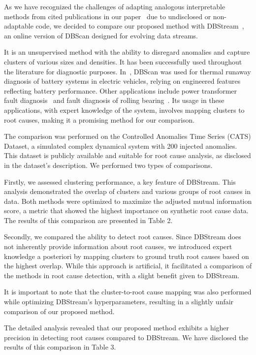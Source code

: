 \documentclass{article}
\begin{document}
\begin{enumerate}
        As we have recognized the challenges of adapting analogous interpretable methods from cited publications in our paper~\cite{Yang2022, Steenwinckel2021} due to undisclosed or non-adaptable code, we decided to compare our proposed method with DBStream~\cite{Hahsler2016}, an online version of DBScan designed for evolving data streams. 
        
        It is an unsupervised method with the ability to disregard anomalies and capture clusters of various sizes and densities. It has been successfully used throughout the literature for diagnostic purposes. In~\cite{Li2019}, DBScan was used for thermal runaway diagnosis of battery systems in electric vehicles, relying on engineered features reflecting battery performance. Other applications include power transformer fault diagnosis~\cite{Liu2020} and fault diagnosis of rolling bearing~\cite{Li2020}.
        Its usage in these applications, with expert knowledge of the system, involves mapping clusters to root causes, making it a promising method for our comparison.

        The comparison was performed on the Controlled Anomalies Time Series (CATS) Dataset, a simulated complex dynamical system with 200 injected anomalies. This dataset is publicly available and suitable for root cause analysis, as disclosed in the dataset's description. We performed two types of comparisons.

        Firstly, we assessed clustering performance, a key feature of DBStream. This analysis demonstrated the overlap of clusters and various groups of root causes in data. Both methods were optimized to maximize the adjusted mutual information score, a metric that showed the highest importance on synthetic root cause data. The results of this comparison are presented in Table 2.

        Secondly, we compared the ability to detect root causes. Since DBStream does not inherently provide information about root causes, we introduced expert knowledge a posteriori by mapping clusters to ground truth root causes based on the highest overlap. While this approach is artificial, it facilitated a comparison of the methods in root cause detection, with a slight benefit given to DBStream.

        It is important to note that the cluster-to-root cause mapping was also performed while optimizing DBStream's hyperparameters, resulting in a slightly unfair comparison of our proposed method.

        The detailed analysis revealed that our proposed method exhibits a higher precision in detecting root causes compared to DBStream. We have disclosed the results of this comparison in Table 3.


\end{enumerate}
\end{document}

